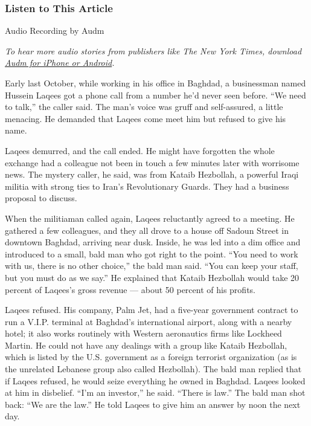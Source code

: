 \hypertarget{listen-to-this-article}{%
\subsubsection{Listen to This Article}\label{listen-to-this-article}}

Audio Recording by Audm

\emph{To hear more audio stories from publishers like The New York
Times, download}
\emph{\href{https://www.audm.com/?utm_source=nyt\&utm_medium=embed\&utm_campaign=wages_of_corruption}{Audm
for iPhone or Android}.}

Early last October, while working in his office in Baghdad, a
businessman named Hussein Laqees got a phone call from a number he'd
never seen before. ``We need to talk,'' the caller said. The man's voice
was gruff and self-assured, a little menacing. He demanded that Laqees
come meet him but refused to give his name.

Laqees demurred, and the call ended. He might have forgotten the whole
exchange had a colleague not been in touch a few minutes later with
worrisome news. The mystery caller, he said, was from Kataib Hezbollah,
a powerful Iraqi militia with strong ties to Iran's Revolutionary
Guards. They had a business proposal to discuss.

When the militiaman called again, Laqees reluctantly agreed to a
meeting. He gathered a few colleagues, and they all drove to a house off
Sadoun Street in downtown Baghdad, arriving near dusk. Inside, he was
led into a dim office and introduced to a small, bald man who got right
to the point. ``You need to work with us, there is no other choice,''
the bald man said. ``You can keep your staff, but you must do as we
say.'' He explained that Kataib Hezbollah would take 20 percent of
Laqees's gross revenue --- about 50 percent of his profits.

Laqees refused. His company, Palm Jet, had a five-year government
contract to run a V.I.P. terminal at Baghdad's international airport,
along with a nearby hotel; it also works routinely with Western
aeronautics firms like Lockheed Martin. He could not have any dealings
with a group like Kataib Hezbollah, which is listed by the U.S.
government as a foreign terrorist organization (as is the unrelated
Lebanese group also called Hezbollah). The bald man replied that if
Laqees refused, he would seize everything he owned in Baghdad. Laqees
looked at him in disbelief. ``I'm an investor,'' he said. ``There is
law.'' The bald man shot back: ``We are the law.'' He told Laqees to
give him an answer by noon the next day.


